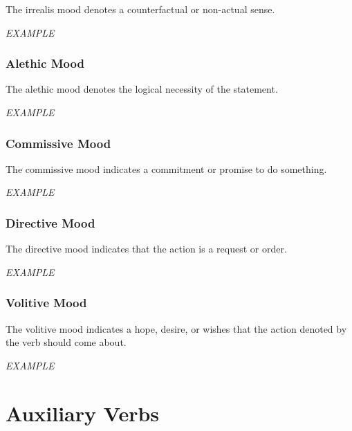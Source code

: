 \documentclass[grammar]{subfiles}
\begin{document}
  The irrealis mood denotes a counterfactual or non-actual sense.

  \begin{exe}
    \ex \emph{EXAMPLE}
  \end{exe}

  \subsubsection{Alethic Mood}
  \label{sssec:vm_alethic}

  The alethic mood denotes the logical necessity of the statement.

  \begin{exe}
    \ex \emph{EXAMPLE}
  \end{exe}

  \subsubsection{Commissive Mood}
  \label{sssec:vm_commissive}

  The commissive mood indicates a commitment or promise to do something.

  \begin{exe}
    \ex \emph{EXAMPLE}
  \end{exe}

  \subsubsection{Directive Mood}
  \label{sssec:vm_directive}

  The directive mood indicates that the action is a request or order.

  \begin{exe}
    \ex \emph{EXAMPLE}
  \end{exe}

  \subsubsection{Volitive Mood}
  \label{sssec:vm_optative}

  The volitive mood indicates a hope, desire, or wishes that the action denoted by the verb should come about.

  \begin{exe}
    \ex \emph{EXAMPLE}
  \end{exe}


  \section{Auxiliary Verbs}
  \label{sec:vm_auxiliary}
\end{document}
